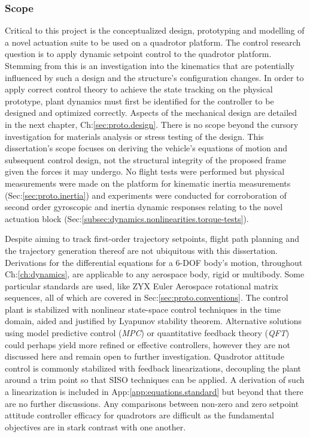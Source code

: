 \subsubsection{Scope}
\label{subsubsec:intro.foreword.scope}
Critical to this project is the conceptualized design, prototyping and modelling of a novel actuation suite to be used on a quadrotor platform. The control research question is to apply dynamic setpoint control to the quadrotor platform. Stemming from this is an investigation into the kinematics that are potentially influenced by such a design and the structure's configuration changes. In order to apply correct control theory to achieve the state tracking on the physical prototype, plant dynamics must first be identified for the controller to be designed and optimized correctly. Aspects of the mechanical design are detailed in the next chapter, Ch:\ref{sec:proto.design}. There is no scope beyond the cursory investigation for materials analysis or stress testing of the design. This dissertation's scope focuses on deriving the vehicle's equations of motion and subsequent control design, not the structural integrity of the proposed frame given the forces it may undergo. No flight tests were performed but physical measurements were made on the platform for kinematic inertia measurements (Sec:\ref{sec:proto.inertia}) and experiments were conducted for corroboration of second order gyroscopic and inertia dynamic responses relating to the novel actuation block (Sec:\ref{subsec:dynamics.nonlinearities.torque-tests}).
\par
Despite aiming to track first-order trajectory setpoints, flight path planning and the trajectory generation thereof are not ubiquitous with this dissertation. Derivations for the differential equations for a 6-DOF body's motion, throughout Ch:\ref{ch:dynamics}, are applicable to any aerospace body, rigid or multibody. Some particular standards are used, like ZYX Euler Aerospace rotational matrix sequences, all of which are covered in Sec:\ref{sec:proto.conventions}. The control plant is stabilized with nonlinear state-space control techniques in the time domain, aided and justified by Lyapunov stability theorem\cite{noteonlyapunov,bojelayupanov}. Alternative solutions using model predictive control (\emph{MPC}) or quantitative feedback theory (\emph{QFT}) could perhaps yield more refined or effective controllers, however they are not discussed here and remain open to further investigation. Quadrotor attitude control is commonly stabilized with feedback linearizations, decoupling the plant around a trim point so that SISO techniques can be applied. A derivation of such a linearization is included in App:\ref{app:equations.standard} but beyond that there are no further discussions. Any comparisons between non-zero and zero setpoint attitude controller efficacy for quadrotors are difficult as the fundamental objectives are in stark contrast with one another.
